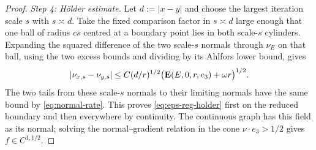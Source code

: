 \begin{proof}
\emph{Step 4: H\"older estimate.}  Let $d:=|x-y|$ and choose the largest
iteration scale $s$ with $s\asymp d$.  Take the fixed comparison factor in
$s\asymp d$ large enough that one ball of radius $cs$ centred at a boundary
point lies in both scale-$s$ cylinders.  Expanding the squared difference of
the two scale-$s$ normals through $\nu_E$ on that ball, using the two excess
bounds and dividing by its Ahlfors lower bound, gives
\[
 |\nu_{x,s}-\nu_{y,s}|
 \le C(d/r)^{1/2}
       \bigl(\operatorname{\mathbf E}(E,0,r,e_3)+\omega r\bigr)^{1/2}.
\]
The two tails from these scale-$s$ normals to their limiting normals have the
same bound by \eqref{eq:normal-rate}.  This proves
\eqref{eq:eps-reg-holder} first on the reduced boundary and then everywhere
by continuity.  The continuous graph has this field as its normal; solving
the normal--gradient relation in the cone $\nu\cdot e_3>1/2$ gives
$f\in C^{1,1/2}$.
\end{proof}

